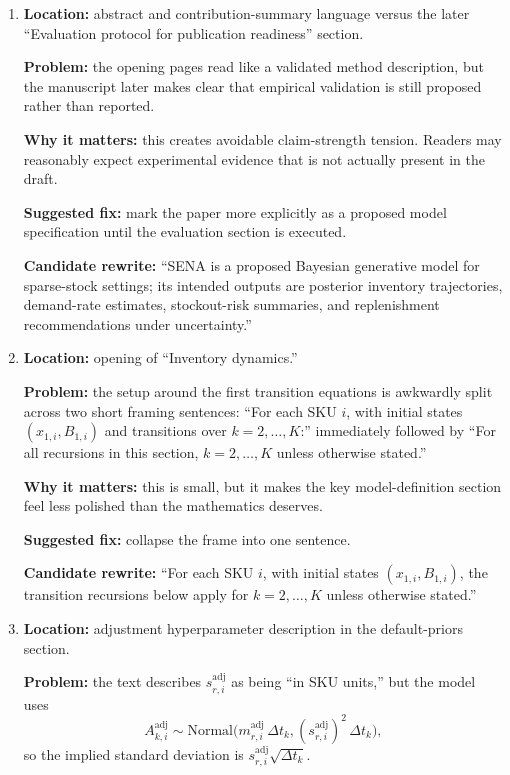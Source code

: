 \documentclass[11pt]{article}
\begin{document}
\begin{enumerate}
  \item \textbf{Location:} abstract and contribution-summary language versus the later ``Evaluation protocol for publication readiness'' section.

  \textbf{Problem:} the opening pages read like a validated method description, but the manuscript later makes clear that empirical validation is still proposed rather than reported.

  \textbf{Why it matters:} this creates avoidable claim-strength tension.
  Readers may reasonably expect experimental evidence that is not actually present in the draft.

  \textbf{Suggested fix:} mark the paper more explicitly as a proposed model specification until the evaluation section is executed.

  \textbf{Candidate rewrite:} ``SENA is a proposed Bayesian generative model for sparse-stock settings; its intended outputs are posterior inventory trajectories, demand-rate estimates, stockout-risk summaries, and replenishment recommendations under uncertainty.''

  \item \textbf{Location:} opening of ``Inventory dynamics.''

  \textbf{Problem:} the setup around the first transition equations is awkwardly split across two short framing sentences:
  ``For each SKU $i$, with initial states $(x_{1,i},B_{1,i})$ and transitions over $k=2,\dots,K$:'' immediately followed by ``For all recursions in this section, $k=2,\dots,K$ unless otherwise stated.''

  \textbf{Why it matters:} this is small, but it makes the key model-definition section feel less polished than the mathematics deserves.

  \textbf{Suggested fix:} collapse the frame into one sentence.

  \textbf{Candidate rewrite:} ``For each SKU $i$, with initial states $(x_{1,i},B_{1,i})$, the transition recursions below apply for $k=2,\dots,K$ unless otherwise stated.''

  \item \textbf{Location:} adjustment hyperparameter description in the default-priors section.

  \textbf{Problem:} the text describes $s^{\mathrm{adj}}_{r,i}$ as being ``in SKU units,'' but the model uses
  \[
    A^{\mathrm{adj}}_{k,i}\sim\text{Normal}\bigl(m^{\mathrm{adj}}_{r,i}\,\Delta t_k,(s^{\mathrm{adj}}_{r,i})^2\,\Delta t_k\bigr),
  \]
  so the implied standard deviation is $s^{\mathrm{adj}}_{r,i}\sqrt{\Delta t_k}$.


\end{enumerate}
\end{document}
